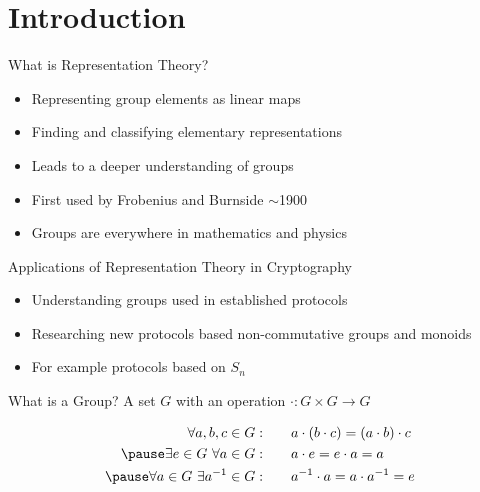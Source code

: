 
\section{Introduction}

\begin{frame}{What is Representation Theory?}
    \large
    \begin{itemize}
        \item Representing group elements as linear maps \pause
        \item Finding and classifying elementary representations \pause
        \item Leads to a deeper understanding of groups \pause
        \item First used by Frobenius and Burnside $\sim$1900 \pause
        \item Groups are everywhere in mathematics and physics
    \end{itemize}
\end{frame}

\begin{frame}{Applications of Representation Theory in Cryptography}
    \large
    \begin{itemize}
        \item Understanding groups used in established protocols \pause
        \item Researching new protocols based non-commutative groups and monoids \pause
        \item For example protocols based on $S_n$
    \end{itemize}
    
    \normalsize
    \hspace*{\fill} \cite{khovanov2022monoidal,doliskani2008cryptosystem}
\end{frame}

\begin{frame}{What is a Group?}
    \Large
    A set $G$ with an operation $\cdot: G \times G \to G$ \pause

    \large
    \begin{align*}
        \forall a, b, c \in G: \qquad & a \cdot (b \cdot c) = (a \cdot b) \cdot c \\ \pause
        \exists e \in G\ \forall a \in G: \qquad & a \cdot e = e \cdot a = a \\ \pause
        \forall a \in G\ \exists a^{-1} \in G: \qquad & a^{-1} \cdot a = a \cdot a^{-1} = e
    \end{align*}
    
\end{frame}

